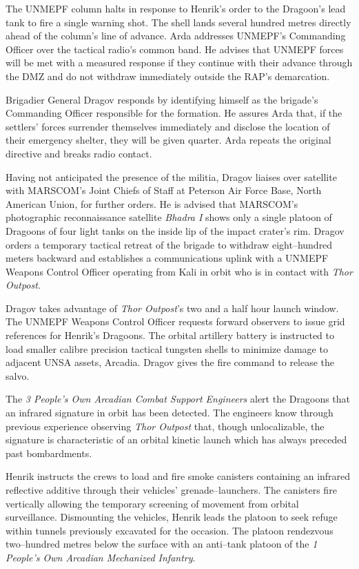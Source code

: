 The UNMEPF column halts in response to Henrik's order to the Dragoon's lead tank to fire a single warning shot. The shell lands several hundred metres directly ahead of the column's line of advance. Arda addresses UNMEPF's Commanding Officer over the tactical radio's common band. He advises that UNMEPF forces will be met with a measured response if they continue with their advance through the DMZ and do not withdraw immediately outside the RAP's demarcation. 

Brigadier General Dragov responds by identifying himself as the brigade's Commanding Officer responsible for the formation. He assures Arda that, if the settlers' forces surrender themselves immediately and disclose the location of their emergency shelter, they will be given quarter. Arda repeats the original directive and breaks radio contact.

Having not anticipated the presence of the militia, Dragov liaises over satellite with MARSCOM's Joint Chiefs of Staff at Peterson Air Force Base, North American Union, for further orders. He is advised that MARSCOM's photographic reconnaissance satellite {\it Bhadra I} shows only a single platoon of Dragoons of four light tanks on the inside lip of the impact crater's rim. Dragov orders a temporary tactical retreat of the brigade to withdraw eight--hundred meters backward and establishes a communications uplink with a UNMEPF Weapons Control Officer operating from Kali in orbit who is in contact with {\it Thor Outpost}.
\StopTimelineDate

Dragov takes advantage of {\it Thor Outpost}'s two and a half hour launch window. The UNMEPF Weapons Control Officer requests forward observers to issue grid references for Henrik's Dragoons. The orbital artillery battery is instructed to load smaller calibre precision tactical tungsten shells to minimize damage to adjacent UNSA assets, Arcadia. Dragov gives the fire command to release the salvo.

The {\it 3 People's Own Arcadian Combat Support Engineers} alert the Dragoons that an infrared signature in orbit has been detected. The engineers know through previous experience observing {\it Thor Outpost} that, though unlocalizable, the signature is characteristic of an orbital kinetic launch which has always preceded past bombardments.

Henrik instructs the crews to load and fire smoke canisters containing an infrared reflective additive through their vehicles' grenade--launchers. The canisters fire vertically allowing the temporary screening of movement from orbital surveillance. Dismounting the vehicles, Henrik leads the platoon to seek refuge within tunnels previously excavated for the occasion. The platoon rendezvous two--hundred metres below the surface with an anti--tank platoon of the {\it 1 People's Own Arcadian Mechanized Infantry}.

